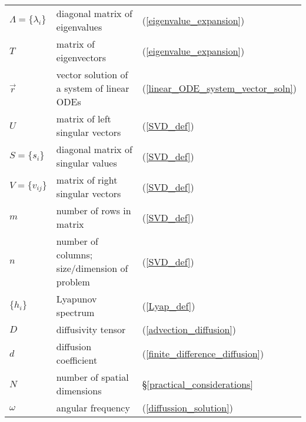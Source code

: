 \begin{tabular}{lll}
	$\Lambda = \lbrace \lambda_i \rbrace$ & diagonal matrix of eigenvalues & (\ref{eigenvalue_expansion}) \\
	$T$ & matrix of eigenvectors & (\ref{eigenvalue_expansion}) \\
	$\vec r$ & vector solution of a system of linear ODEs & (\ref{linear_ODE_system_vector_soln}) \\
	$U$ & matrix of left singular vectors & (\ref{SVD_def}) \\
	$S=\lbrace s_i \rbrace$ & diagonal matrix of singular values & (\ref{SVD_def}) \\
	$V=\lbrace v_{ij} \rbrace$ & matrix of right singular vectors & (\ref{SVD_def}) \\
	$m$ & number of rows in matrix & (\ref{SVD_def}) \\
	$n$ & number of columns; size/dimension of problem & (\ref{SVD_def}) \\
	$\lbrace h_i \rbrace$ & Lyapunov spectrum & (\ref{Lyap_def}) \\
	$D$ & diffusivity tensor & (\ref{advection_diffusion}) \\
	$d$ & diffusion coefficient & (\ref{finite_difference_diffusion}) \\
	$N$ & number of spatial dimensions & \S \ref{practical_considerations} \\
	$\omega$ & angular frequency & (\ref{diffussion_solution})
\end{tabular}

